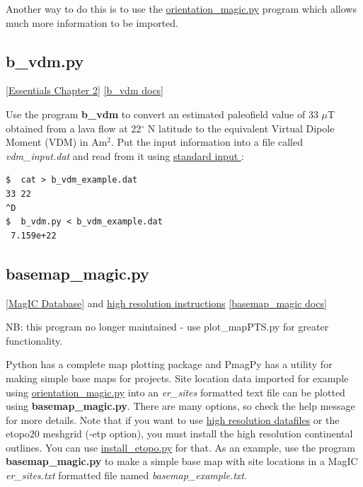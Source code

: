 \documentclass[11pt]{book}
\begin{document}
{{Another way to do this is to use the \href{#orientation_magic.py}{orientation\_magic.py} program which allows much more information to be imported.


\subsection{b\_vdm.py}
\href{http://earthref.org/MAGIC/books/Tauxe/Essentials/WebBook3ch2.html#Virtual_dipole_moment}{[Essentials Chapter 2]}
\href{https://github.com/PmagPy/PmagPy/blob/master/programs/b_vdm.py}{[b\_vdm docs]}

Use the program {\bf b\_vdm} to convert an estimated paleofield value of 33 $\mu$T obtained from a lava flow at 22$^{\circ}$ N latitude to the equivalent Virtual Dipole Moment (VDM) in Am$^2$.   Put the input information into a file called {\it vdm\_input.dat}  and read from it using  \href{#standard_IO}{standard input }:

\begin{verbatim}
$  cat > b_vdm_example.dat
33 22
^D
$  b_vdm.py < b_vdm_example.dat
 7.159e+22
\end{verbatim}


\subsection{basemap\_magic.py}
\label{ex:basemap_magic}
\href{#MagICDatabase}{[MagIC Database]} and   \href{#HighRes}{high resolution instructions}
\href{https://github.com/PmagPy/PmagPy/blob/master/programs/basemap_magic.py}{[basemap\_magic docs]}

NB:  this program no longer maintained - use plot_mapPTS.py for greater functionality.

Python has a complete map plotting package and PmagPy has a utility for making simple base maps for projects.  Site location data imported for example using \href{#orientation_magic.py}{orientation\_magic.py} into an {\it er\_sites} formatted text file can be plotted using {\bf basemap\_magic.py}.  There are many options, so check the help message for more details.   Note that if you want to use  \href{#hires}{high resolution datafiles}
 or the etopo20 meshgrid (-etp option), you must install the high resolution continental outlines.  You can use \href{#install_etopo.py}{install\_etopo.py}  for that.
As an example, use the program {\bf basemap\_magic.py} to make  a simple base map  with site locations in a MagIC {\it er\_sites.txt}  formatted file named {\it basemap\_example.txt}.

}}
\end{document}
